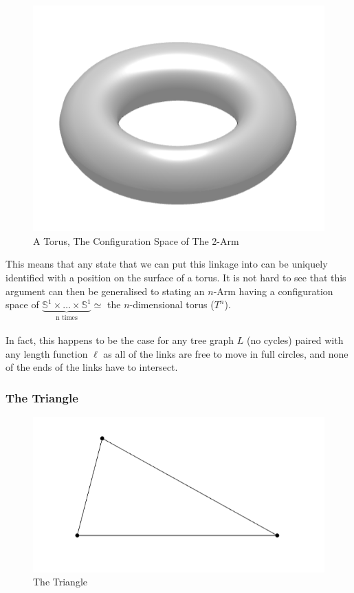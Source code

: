 \documentclass{article}
\begin{document}
\begin{figure}[h!]
\centering
\includegraphics[scale=0.5]{./images/torus}
\caption{A Torus, The Configuration Space of The 2-Arm}
\label{fig:A Torus, The Configuration Space of The 2-Arm}
\end{figure}

\noindent This means that any state that we can put this linkage into can be uniquely identified with a position on the surface of a torus. It is not hard to see that this argument can then be generalised to stating an $n$-Arm having a configuration space of $\underbrace{ \mathbb S^1 \times \dots \times \mathbb S^1}_\text{n times} \simeq$ the $n$-dimensional torus ($T^n$). \\\\ In fact, this happens to be the case for any tree graph $L$ (no cycles) paired with any length function $\ell$ as all of the links are free to move in full circles, and none of the ends of the links have to intersect.


\subsubsection{The Triangle}

\begin{figure}[h!]
\centering
\includegraphics[scale=0.5]{./images/triangle}
\caption{The Triangle}
\label{fig:The Triangle}
\end{figure}
\end{document}

